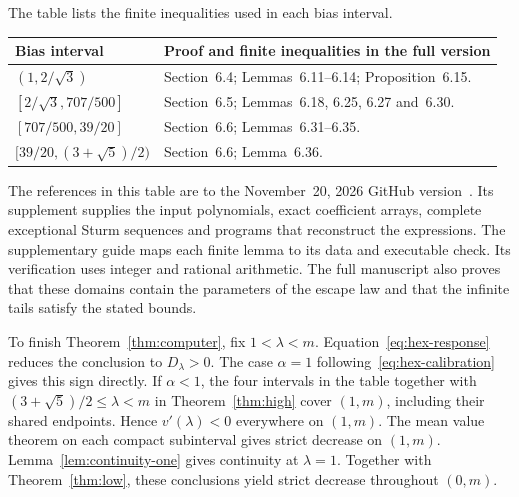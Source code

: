 The table lists the finite inequalities used in each bias interval.
\begin{center}
\small
\begin{tabular}{@{}p{.32\linewidth}p{.59\linewidth}@{}}
\toprule
Bias interval & Proof and finite inequalities in the full version\\
\midrule
$(1,2/\sqrt3)$ & Section~6.4; Lemmas~6.11--6.14; Proposition~6.15.\\[3pt]
$[2/\sqrt3,707/500]$ & Section~6.5; Lemmas~6.18, 6.25, 6.27 and~6.30.\\[3pt]
$[707/500,39/20]$ & Section~6.6; Lemmas~6.31--6.35.\\[3pt]
$[39/20,(3+\sqrt5)/2)$ & Section~6.6; Lemma~6.36.\\
\bottomrule
\end{tabular}
\end{center}
The references in this table are to the November~20, 2026 GitHub
version~\cite{FullVersion}. Its supplement supplies the input
polynomials, exact coefficient arrays, complete exceptional Sturm
sequences and programs that reconstruct the expressions. The
supplementary guide maps each finite lemma to its data and executable
check. Its verification uses integer and rational arithmetic.
The full manuscript also proves that these domains contain the parameters of the escape law and that the infinite tails satisfy the stated bounds.

To finish Theorem~\ref{thm:computer}, fix $1<\lambda<m$.
Equation~\eqref{eq:hex-response} reduces the conclusion to
$D_\lambda>0$. The case $\alpha=1$ following~\eqref{eq:hex-calibration} gives this sign directly. If $\alpha<1$, the four intervals in the table together with $(3+\sqrt5)/2\le\lambda<m$ in Theorem~\ref{thm:high} cover $(1,m)$, including their shared endpoints.
Hence $v'(\lambda)<0$ everywhere on $(1,m)$. The mean value theorem
on each compact subinterval gives strict decrease on $(1,m)$. Lemma~\ref{lem:continuity-one} gives continuity at $\lambda=1$. Together with Theorem~\ref{thm:low}, these conclusions yield strict decrease throughout $(0,m)$.

